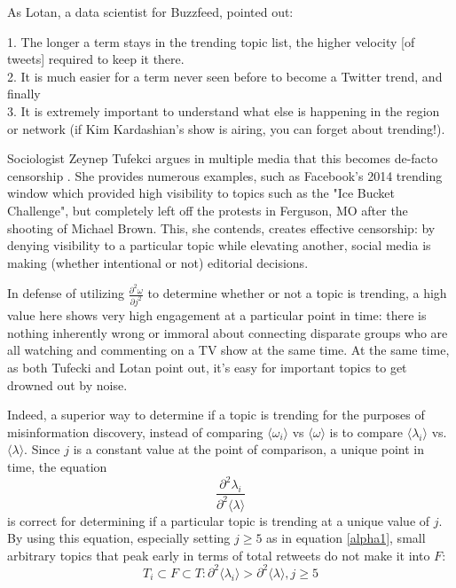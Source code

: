 \documentclass[NETN,manuscript]{stjour-new}
\begin{document}
As Lotan, a data scientist for Buzzfeed, pointed out:
\begin{displayquote}
1. The longer a term stays in the trending topic list, the higher velocity [of tweets] required to keep it there. \\
2. It is much easier for a term never seen before to become a Twitter trend, and finally \\
3. It is extremely important to understand what else is happening in the region or network (if Kim Kardashian’s show is airing, you can forget about trending!).
\end{displayquote}

Sociologist Zeynep Tufekci argues in multiple media that this becomes de-facto censorship \citep{tufekci2017twitter,tufecki2018democracy,tufekci2017we,tufekci2014online}. She provides numerous examples, such as Facebook's 2014 trending window which provided high visibility to topics such as the "Ice Bucket Challenge", but completely left off the protests in Ferguson, MO after the shooting of Michael Brown. This, she contends, creates effective censorship: by denying visibility to a particular topic while elevating another, social media is making (whether intentional or not) editorial decisions. 

In defense of utilizing $\frac{\partial^2 \omega}{\partial j^2}$ to determine whether or not a topic is trending, a high value here shows very high engagement at a particular point in time: there is nothing inherently wrong or immoral about connecting disparate groups who are all watching and commenting on a TV show at the same time. At the same time, as both Tufecki and Lotan point out, it's easy for important topics to get drowned out by noise.


Indeed, a superior way to determine if a topic is trending for the purposes of misinformation discovery, instead of comparing $\langle \omega_i \rangle$ vs $\langle \omega \rangle$ is to compare $\langle \lambda_i \rangle$ vs. $\langle \lambda \rangle$. Since $j$ is a constant value at the point of comparison, a unique point in time, the equation \[\frac{\partial^2 \lambda_i}
{\partial^2 \langle \lambda \rangle}\] is correct for determining if a particular topic is trending at a unique value of $j$. By using this equation, especially setting $j \geq 5$ as in equation \ref{alpha1}, small arbitrary topics that peak early in terms of total retweets do not make it into $F$:
\begin{equation}
    \label{Trending}
    T_i \subset F \subset T: \partial^2 \langle \lambda_i \rangle > \partial^2 \langle \lambda \rangle, j \geq 5
\end{equation}
\end{document}

